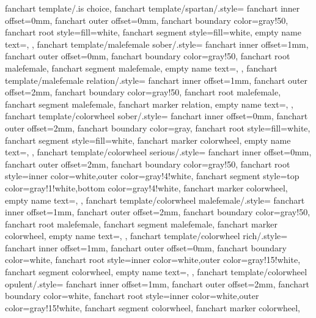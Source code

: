\gtrset
  {
    fanchart template/.is choice,
%
    fanchart template/spartan/.style=
      {
        fanchart inner offset={0mm},
        fanchart outer offset={0mm},
        fanchart boundary color=gray!50,
        fanchart root style={fill=white},
        fanchart segment style={fill=white},
        empty name text={},
      },
    fanchart template/malefemale sober/.style=
      {
        fanchart inner offset={1mm},
        fanchart outer offset={0mm},
        fanchart boundary color=gray!50,
        fanchart root malefemale,
        fanchart segment malefemale,
        empty name text={},
      },
    fanchart template/malefemale relation/.style=
      {
        fanchart inner offset={1mm},
        fanchart outer offset={2mm},
        fanchart boundary color=gray!50,
        fanchart root malefemale,
        fanchart segment malefemale,
        fanchart marker relation,
        empty name text={},
      },
    fanchart template/colorwheel sober/.style=
      {
        fanchart inner offset={0mm},
        fanchart outer offset={2mm},
        fanchart boundary color=gray,
        fanchart root style={fill=white},
        fanchart segment style={fill=white},
        fanchart marker colorwheel,
        empty name text={},
      },
    fanchart template/colorwheel serious/.style=
      {
        fanchart inner offset={0mm},
        fanchart outer offset={2mm},
        fanchart boundary color=gray!50,
        fanchart root style={inner color=white,outer color=gray!4!white},
        fanchart segment style={top color=gray!1!white,bottom color=gray!4!white},
        fanchart marker colorwheel,
        empty name text={},
      },
    fanchart template/colorwheel malefemale/.style=
      {
        fanchart inner offset={1mm},
        fanchart outer offset={2mm},
        fanchart boundary color=gray!50,
        fanchart root malefemale,
        fanchart segment malefemale,
        fanchart marker colorwheel,
        empty name text={},
      },
    fanchart template/colorwheel rich/.style=
      {
        fanchart inner offset={1mm},
        fanchart outer offset={0mm},
        fanchart boundary color=white,
        fanchart root style={inner color=white,outer color=gray!15!white},
        fanchart segment colorwheel,
        empty name text={},
      },
    fanchart template/colorwheel opulent/.style=
      {
        fanchart inner offset={1mm},
        fanchart outer offset={2mm},
        fanchart boundary color=white,
        fanchart root style={inner color=white,outer color=gray!15!white},
        fanchart segment colorwheel,
        fanchart marker colorwheel,
}}
